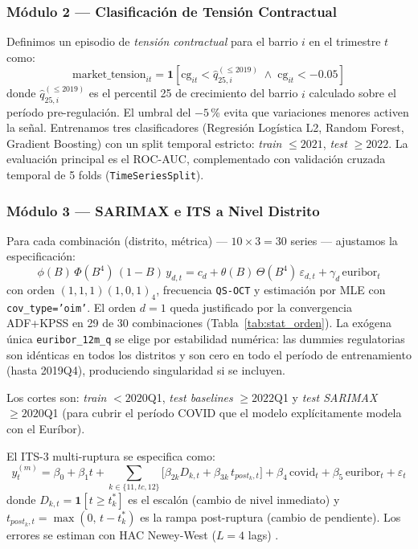 \documentclass[12pt,a4paper]{article}
\begin{document}
\subsubsection{Módulo 2 --- Clasificación de Tensión Contractual}

Definimos un episodio de \textit{tensión contractual} para el barrio $i$ en el
trimestre $t$ como:
\begin{equation}
  \text{market\_tension}_{it} =
  \mathbf{1}\!\left[
    \text{cg}_{it} < \hat{q}_{25,i}^{(\leq 2019)}
    \;\wedge\;
    \text{cg}_{it} < -0.05
  \right]
  \label{eq:tension}
\end{equation}
donde $\hat{q}_{25,i}^{(\leq 2019)}$ es el percentil 25 de crecimiento del barrio $i$
calculado sobre el período pre-regulación. El umbral del $-5$\,\% evita que variaciones
menores activen la señal. Entrenamos tres clasificadores (Regresión Logística L2,
Random Forest, Gradient Boosting) con un split temporal estricto: \textit{train}
$\leq 2021$, \textit{test} $\geq 2022$. La evaluación principal es el ROC-AUC,
complementado con validación cruzada temporal de 5 folds (\texttt{TimeSeriesSplit}).

\subsubsection{Módulo 3 --- SARIMAX e ITS a Nivel Distrito}

Para cada combinación (distrito, métrica) --- $10 \times 3 = 30$ series --- ajustamos
la especificación:
\begin{equation}
  \phi(B)\,\Phi(B^4)\,(1-B)\,y_{d,t}
  = c_d + \theta(B)\,\Theta(B^4)\,\varepsilon_{d,t}
    + \gamma_d\,\text{euribor}_t
  \label{eq:sarimax}
\end{equation}
con orden $(1,1,1)(1,0,1)_4$, frecuencia \texttt{QS-OCT} y estimación por MLE con
\texttt{cov\_type='oim'}. El orden $d=1$ queda justificado por la convergencia ADF+KPSS
en 29 de 30 combinaciones (Tabla~\ref{tab:stat_orden}). La exógena única
\texttt{euribor\_12m\_q} se elige por estabilidad numérica: las dummies regulatorias
son idénticas en todos los distritos y son cero en todo el período de entrenamiento
(hasta 2019Q4), produciendo singularidad si se incluyen.

Los cortes son: \textit{train} $< 2020$Q1, \textit{test baselines} $\geq 2022$Q1 y
\textit{test SARIMAX} $\geq 2020$Q1 (para cubrir el período COVID que el modelo
explícitamente modela con el Euríbor).

El ITS-3 multi-ruptura se especifica como:
\begin{equation}
  y_t^{(m)} = \beta_0 + \beta_1 t
  + \sum_{k \in \{11, tc, 12\}}
      \!\bigl[\beta_{2k} D_{k,t} + \beta_{3k}\, t_{post_k,t}\bigr]
  + \beta_4\,\text{covid}_t + \beta_5\,\text{euribor}_t + \varepsilon_t
  \label{eq:its3}
\end{equation}
donde $D_{k,t} = \mathbf{1}[t \geq t_k^*]$ es el escalón (cambio de nivel inmediato) y
$t_{post_k,t} = \max(0,\, t - t_k^*)$ es la rampa post-ruptura (cambio de pendiente).
Los errores se estiman con HAC Newey-West ($L = 4$ lags) \citep{newey1987hac}.
\end{document}
